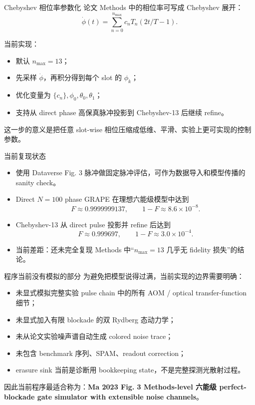 \documentclass[aspectratio=169,11pt]{ctexbeamer}
\begin{document}
\begin{frame}{Chebyshev 相位率参数化}
  论文 Methods 中的相位率可写成 Chebyshev 展开：
  \[
    \dot{\phi}(t)
    =
    \sum_{n=0}^{n_{\max}} c_n
    T_n\left(2t/T-1\right).
  \]

  当前实现：
  \begin{itemize}
    \item 默认 \(n_{\max}=13\)；
    \item 先采样 \(\dot{\phi}\)，再积分得到每个 slot 的 \(\phi_k\)；
    \item 优化变量为 \(\{c_n\},\phi_0,\theta_0,\theta_1\)；
    \item 支持从 direct phase 高保真脉冲投影到 Chebyshev-13 后继续 refine。
  \end{itemize}

  这一步的意义是把任意 slot-wise 相位压缩成低维、平滑、实验上更可实现的控制参数。
\end{frame}

\begin{frame}{当前复现状态}
  \begin{itemize}
    \item 使用 Dataverse Fig. 3 脉冲做固定脉冲评估，可作为数据导入和模型传播的 sanity check。
    \item Direct \(N=100\) phase GRAPE 在理想六能级模型中达到
      \[
      F \approx 0.9999999137,
      \qquad
      1-F \approx 8.6\times 10^{-8}.
      \]
    \item Chebyshev-13 从 direct pulse 投影并 refine 后达到
      \[
      F \approx 0.999697,
      \qquad
      1-F \approx 3.0\times 10^{-4}.
      \]
    \item 当前差距：还未完全复现 Methods 中“\(n_{\max}=13\) 几乎无 fidelity 损失”的结论。
  \end{itemize}
\end{frame}

\begin{frame}{程序当前没有模拟的部分}
  为避免把模型说得过满，当前实现的边界需要明确：

  \begin{itemize}
    \item 未显式模拟完整实验 pulse chain 中的所有 AOM / optical transfer-function 细节；
    \item 未显式加入有限 blockade 的双 Rydberg 态动力学；
    \item 未从论文实验噪声谱自动生成 colored noise trace；
    \item 未包含 benchmark 序列、SPAM、readout correction；
    \item erasure sink 当前是诊断用 bookkeeping state，不是完整探测光散射过程。
  \end{itemize}

  因此当前程序最适合称为：\textbf{Ma 2023 Fig. 3 Methods-level 六能级 perfect-blockade gate simulator with extensible noise channels}。
\end{frame}
\end{document}
